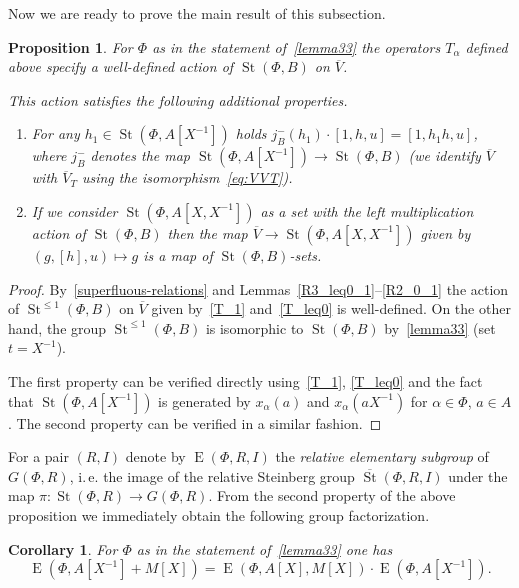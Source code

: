 \documentclass[oneside, 8pt]{amsart}
\newtheorem{prop}[lemma]{Proposition}
\newtheorem{corollary}[lemma]{Corollary}
\theoremstyle{remark}
\theoremstyle{definition}
\numberwithin{lemma}{section}
\numberwithin{prop}{section}
\numberwithin{corollary}{section}
\numberwithin{externaltheorem}{section}
\DeclareMathOperator{\St}{St}
\DeclareMathOperator{\E}{E}
\newcommand{\inv}{^{-1}}
\numberwithin{equation}{section}
\begin{document}
Now we are ready to prove the main result of this subsection.
\begin{prop} \label{prop43}
For $\Phi$ as in the statement of~\cref{lemma33} the operators $T_\alpha$ defined above specify a well-defined action of $\St(\Phi, B)$ on $\overline{V}$. 

This action satisfies the following additional properties.
\begin{enumerate}
 \item For any $h_1 \in \St(\Phi, A[X\inv])$ holds $j_B^-(h_1) \cdot [1, h, u] = [1, h_1 h, u]$, where $j_B^-$ denotes the map $\St(\Phi, A[X\inv]) \to \St(\Phi, B)$ (we identify $\overline{V}$ with $\overline{V}_T$ using the isomorphism~\eqref{eq:VVT}).
 \item If we consider $\St(\Phi, A[X, X\inv])$ as a set with the left multiplication action of $\St(\Phi, B)$ then the map $\overline{V} \to \St(\Phi, A[X, X\inv])$ given by $(g, [h], u) \mapsto g$ is a map of $\St(\Phi, B)$-sets.
\end{enumerate}
\end{prop}
\begin{proof} By~\cref{superfluous-relations} and Lemmas~\ref{R3_leq0_1}--\ref{R2_0_1} the action of $\St^{\leq 1}(\Phi, B)$ on $\overline{V}$ given by~\eqref{T_1} and~\eqref{T_leq0} is well-defined. On the other hand, the group $\St^{\leq 1}(\Phi, B)$ is isomorphic to $\St(\Phi, B)$ by~\cref{lemma33} (set $t = X^{-1}$).
  
The first property can be verified directly using~\eqref{T_1}, \eqref{T_leq0} and the fact that $\St(\Phi, A[X\inv])$ is generated by $x_\alpha(a)$ and $x_\alpha(aX\inv)$ for $\alpha\in\Phi$, $a\in A$. The second property can be verified in a similar fashion. \end{proof}

For a pair $(R, I)$ denote by $\E(\Phi, R, I)$ the {\it relative elementary subgroup} of $G(\Phi, R)$, i.\,e.
the image of the relative Steinberg group $\overline{\St}(\Phi, R, I)$ under the map $\pi \colon \St(\Phi, R) \to G(\Phi, R)$.
From the second property of the above proposition we immediately obtain the following group factorization.
\begin{corollary} For $\Phi$ as in the statement of~\cref{lemma33} one has
\[\E(\Phi, A[X\inv] + M[X]) = \E(\Phi, A[X], M[X]) \cdot \E(\Phi, A[X\inv]).\] \end{corollary}
\end{document}
